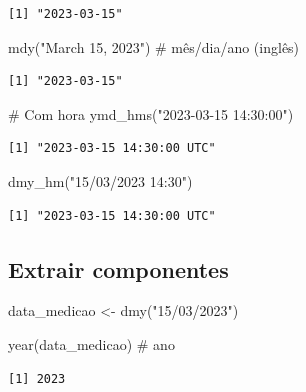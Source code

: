 \documentclass[
  letterpaper,
]{scrbook}
\newenvironment{Shaded}{\begin{snugshade}}{\end{snugshade}}
\newcommand{\CommentTok}[1]{\textcolor[rgb]{0.37,0.37,0.37}{#1}}
\newcommand{\FunctionTok}[1]{\textcolor[rgb]{0.28,0.35,0.67}{#1}}
\newcommand{\NormalTok}[1]{\textcolor[rgb]{0.00,0.23,0.31}{#1}}
\newcommand{\OtherTok}[1]{\textcolor[rgb]{0.00,0.23,0.31}{#1}}
\newcommand{\StringTok}[1]{\textcolor[rgb]{0.13,0.47,0.30}{#1}}
\begin{document}
\begin{verbatim}
[1] "2023-03-15"
\end{verbatim}

\begin{Shaded}
\begin{Highlighting}[]
\FunctionTok{mdy}\NormalTok{(}\StringTok{"March 15, 2023"}\NormalTok{)   }\CommentTok{\# mês/dia/ano (inglês)}
\end{Highlighting}
\end{Shaded}

\begin{verbatim}
[1] "2023-03-15"
\end{verbatim}

\begin{Shaded}
\begin{Highlighting}[]
\CommentTok{\# Com hora}
\FunctionTok{ymd\_hms}\NormalTok{(}\StringTok{"2023{-}03{-}15 14:30:00"}\NormalTok{)}
\end{Highlighting}
\end{Shaded}

\begin{verbatim}
[1] "2023-03-15 14:30:00 UTC"
\end{verbatim}

\begin{Shaded}
\begin{Highlighting}[]
\FunctionTok{dmy\_hm}\NormalTok{(}\StringTok{"15/03/2023 14:30"}\NormalTok{)}
\end{Highlighting}
\end{Shaded}

\begin{verbatim}
[1] "2023-03-15 14:30:00 UTC"
\end{verbatim}

\subsection{Extrair componentes}\label{extrair-componentes}

\begin{Shaded}
\begin{Highlighting}[]
\NormalTok{data\_medicao }\OtherTok{\textless{}{-}} \FunctionTok{dmy}\NormalTok{(}\StringTok{"15/03/2023"}\NormalTok{)}

\FunctionTok{year}\NormalTok{(data\_medicao)     }\CommentTok{\# ano}
\end{Highlighting}
\end{Shaded}

\begin{verbatim}
[1] 2023
\end{verbatim}
\end{document}
